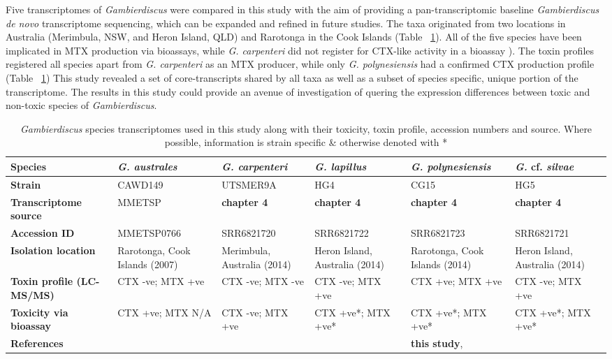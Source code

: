 \documentclass[12pt]{article}
\begin{document}
Five transcriptomes of \textit{Gambierdiscus} were compared in this study with the aim of providing a pan-transcriptomic baseline \textit{Gambierdiscus de novo} transcriptome sequencing, which can be expanded and refined in future studies. 
The taxa originated from two locations in Australia (Merimbula, NSW, and Heron Island, QLD) and Rarotonga in the Cook Islands (Table ~\ref{tbl:StrainTable}). 
All of the five species have been implicated in MTX production via bioassays, while \textit{G. carpenteri} did not register for CTX-like activity in a bioassay \cite{larsson2018toxicology}). 
The toxin profiles registered all species apart from \textit{G. carpenteri} as an MTX producer, while only \textit{G. polynesiensis} had a confirmed CTX production profile (Table ~\ref{tbl:StrainTable})
This study revealed a set of core-transcripts shared by all taxa as  well as a subset of species specific, unique portion of the transcriptome. 
The results in this study could provide an avenue of investigation of quering the expression differences between toxic and non-toxic species of \textit{Gambierdiscus}.

\FloatBarrier
\begin{table}
\caption{\emph{Gambierdiscus} species transcriptomes used in this study along with their toxicity, toxin profile, accession numbers and source. Where possible, information is strain specific \& otherwise denoted with *}
\label{tbl:StrainTable}
\begin{tabular}{ | p{2.5cm} | p{2.3cm} | p{2.3cm} | p{2.3cm} | p{2.3cm} | p{2.3cm}|}
\hline
\textbf{Species}&\textit{G. australes}&\textit{G. carpenteri}&\textit{G. lapillus}&\textit{G. polynesiensis}&\textit{G.} cf. \textit{silvae}\\
\hline
\textbf{Strain}&CAWD149&UTSMER9A&HG4&CG15&HG5\\
\hline
\textbf{Transcriptome source}&MMETSP&\textbf{chapter 4}&\textbf{chapter 4}&\textbf{chapter 4}&\textbf{chapter 4}\\
\hline
\textbf{Accession ID}&MMETSP0766&SRR6821720&SRR6821722&SRR6821723&SRR6821721\\
\hline
\textbf{Isolation location}&Rarotonga, Cook Islands (2007)&Merimbula, Australia (2014)&Heron Island, Australia (2014)&Rarotonga, Cook Islands (2014)&Heron Island, Australia (2014)\\
\hline
\textbf{Toxin profile (LC-MS/MS)}&CTX -ve; MTX +ve&CTX -ve; MTX -ve&CTX -ve; MTX +ve&CTX +ve; MTX +ve&CTX -ve; MTX +ve\\
\hline
\textbf{Toxicity via bioassay}&CTX +ve; MTX N/A&CTX -ve; MTX +ve&CTX +ve*; MTX +ve*&CTX +ve*; MTX +ve*&CTX +ve*; MTX +ve*\\
\hline
\textbf{References}&\cite{keeling2014marine,rhodes2010toxic,munday2017ciguatoxins}&\cite{larsson2018toxicology}&\cite{larsson2018toxicology,kretzschmar2017characterization}&\textbf{this study}, \cite{chinain2010growth}&\cite{larsson2018toxicology,kretzschmar2017characterization}\\
\hline
\end{tabular}
\end{table}
\FloatBarrier
\newpage
\end{document}
